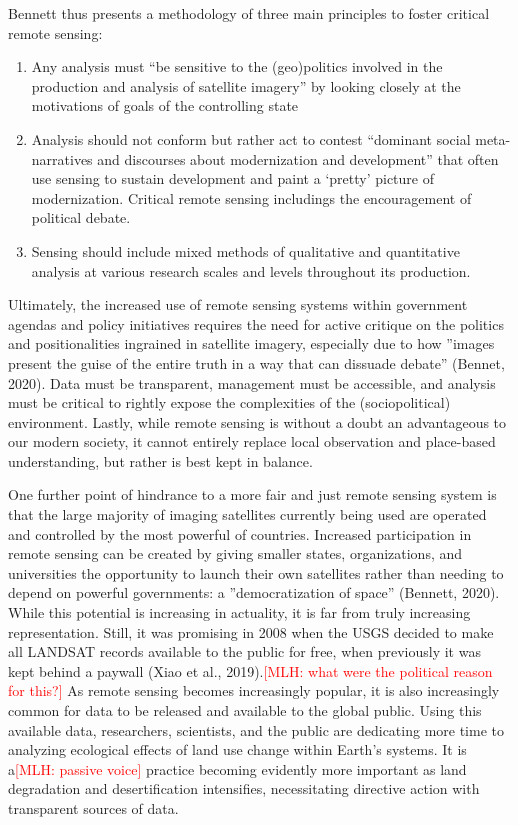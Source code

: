 \documentclass{book}\usepackage{knitr}
\newcommand{\red}[1]{\textcolor{red}{[MLH: #1]}}
\begin{document}
\begin{knitrout}
\begin{kframe}
Bennett thus presents a methodology of three main principles to foster critical remote sensing:
\begin{enumerate}
\item Any analysis must ``be sensitive to the (geo)politics involved in the production and analysis of satellite imagery'' by looking closely at the motivations of goals of the controlling state
\item Analysis should not conform but rather act to contest ``dominant social meta-narratives and discourses about modernization and development'' that often use sensing to sustain development and paint a `pretty' picture of modernization. Critical remote sensing includings the encouragement of political debate.
\item Sensing should include mixed methods of qualitative and quantitative analysis at various research scales and levels throughout its production.
\end{enumerate}

Ultimately, the increased use of remote sensing systems within government agendas and policy initiatives requires the need for active critique on the politics and positionalities ingrained in satellite imagery, especially due to how ''images present the guise of the entire truth in a way that can dissuade debate'' (Bennet, 2020). Data must be transparent, management must be accessible, and analysis must be critical to rightly expose the complexities of the (sociopolitical) environment. Lastly, while remote sensing is without a doubt an advantageous to our modern society, it cannot entirely replace local observation and place-based understanding, but rather is best kept in balance.

One further point of hindrance to a more fair and just remote sensing system is that the large majority of imaging satellites currently being used are operated and controlled by the most powerful of countries. Increased participation in remote sensing can be created by giving smaller states, organizations, and universities the opportunity to launch their own satellites rather than needing to depend on powerful governments: a ''democratization of space'' (Bennett, 2020). While this potential is increasing in actuality, it is far from truly increasing representation. Still, it was promising in 2008 when the USGS decided to make all LANDSAT records available to the public for free, when previously it was kept behind a paywall (Xiao et al., 2019).\red{what were the political reason for this?} As remote sensing becomes increasingly popular, it is also increasingly common for data to be released and available to the global public. Using this available data, researchers, scientists, and the public are dedicating more time to analyzing ecological effects of land use change within Earth's systems. It is a\red{passive voice} practice becoming evidently more important as land degradation and desertification intensifies, necessitating directive action with transparent sources of data.


\end{kframe}
\end{knitrout}
\end{document}
